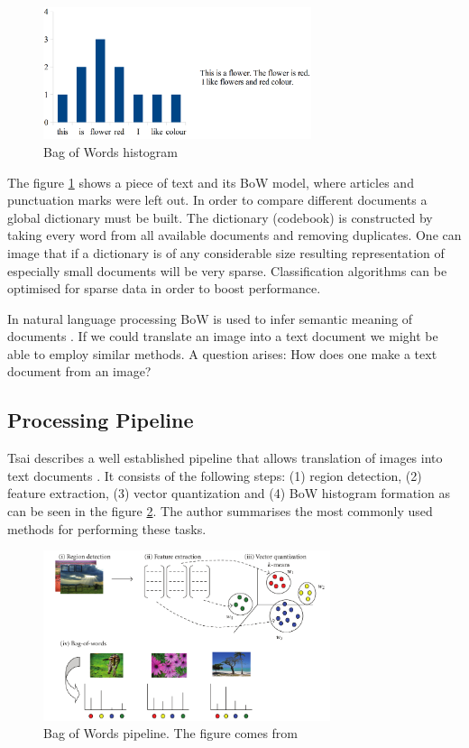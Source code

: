 	\begin{figure}[!ht]
	\centering
	\includegraphics[width=0.7\textwidth]{figs/bow_example}
	\caption{Bag of Words histogram}
	\label{fig:bow_example}
	\end{figure}
	
	The figure \ref{fig:bow_example} shows a piece of text and its BoW model, where articles and punctuation marks were left out. In order to compare different documents a global dictionary must be built. The dictionary (codebook) is constructed by taking every word from all available documents and removing duplicates. One can image that if a dictionary is of any considerable size resulting representation of especially small documents will be very sparse. Classification algorithms can be optimised for sparse data in order to boost performance.

	In natural language processing BoW is used to infer semantic meaning of documents . If we could translate an image into a text document we might be able to employ similar methods. A question arises: How does one make a text document from an image?

	\subsection{Processing Pipeline}	
	Tsai describes a well established pipeline that allows translation of images into text documents \cite{tsai2012bag}. It consists of the following steps: (1) region detection, (2) feature extraction, (3) vector quantization and (4) BoW histogram formation as can be seen in the figure \ref{fig:bow_pipeline}. The author summarises the most commonly used methods for performing these tasks. 
	
	\begin{figure}[!ht]
	\centering
	\includegraphics[width=0.75\textwidth]{figs/tsai2012}
	\caption{Bag of Words pipeline. The figure comes from \cite{tsai2012bag}}
	\label{fig:bow_pipeline}
	\end{figure}
	
